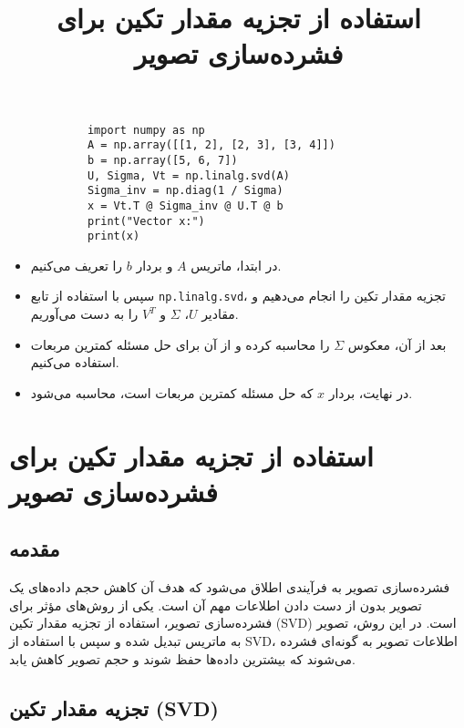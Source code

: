 \begin{code}
	\begin{latin}
		\begin{lstlisting}
			import numpy as np
			A = np.array([[1, 2], [2, 3], [3, 4]])
			b = np.array([5, 6, 7])
			U, Sigma, Vt = np.linalg.svd(A)
			Sigma_inv = np.diag(1 / Sigma)
			x = Vt.T @ Sigma_inv @ U.T @ b
			print("Vector x:")
			print(x)
		\end{lstlisting}
	\end{latin}
\end{code}


\begin{nokteh}
	\begin{itemize}
		\item در ابتدا، ماتریس \(A\) و بردار \(b\) را تعریف می‌کنیم.
		\item سپس با استفاده از تابع \texttt{np.linalg.svd}، تجزیه مقدار تکین را انجام می‌دهیم و مقادیر \(U\)، \(\Sigma\) و \(V^T\) را به دست می‌آوریم.
		\item بعد از آن، معکوس \(\Sigma\) را محاسبه کرده و از آن برای حل مسئله کمترین مربعات استفاده می‌کنیم.
		\item در نهایت، بردار \(x\) که حل مسئله کمترین مربعات است، محاسبه می‌شود.
	\end{itemize}
\end{nokteh}
\title{استفاده از تجزیه مقدار تکین برای فشرده‌سازی تصویر}
\author{}
\date{}


\maketitle
\section{استفاده از تجزیه مقدار تکین برای فشرده‌سازی تصویر}
\subsection{مقدمه}

فشرده‌سازی تصویر به فرآیندی اطلاق می‌شود که هدف آن کاهش حجم داده‌های یک تصویر بدون از دست دادن اطلاعات مهم آن است. یکی از روش‌های مؤثر برای فشرده‌سازی تصویر، استفاده از تجزیه مقدار تکین (SVD) است. در این روش، تصویر به ماتریس تبدیل شده و سپس با استفاده از SVD، اطلاعات تصویر به گونه‌ای فشرده می‌شوند که بیشترین داده‌ها حفظ شوند و حجم تصویر کاهش یابد.

\subsection{تجزیه مقدار تکین (SVD)}

